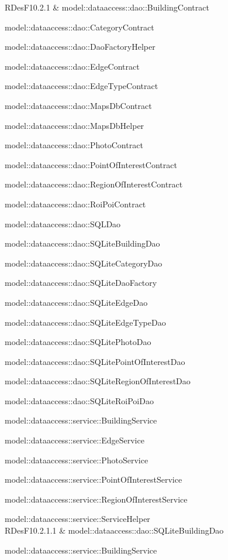 \documentclass[../DefinizioneDiProdotto.tex]{subfiles}
\begin{document}
\begin{longtabu}
RDesF10.2.1 & model::dataaccess::dao::BuildingContract \par model::dataaccess::dao::CategoryContract \par model::dataaccess::dao::DaoFactoryHelper \par model::dataaccess::dao::EdgeContract \par model::dataaccess::dao::EdgeTypeContract \par model::dataaccess::dao::MapsDbContract \par model::dataaccess::dao::MapsDbHelper \par model::dataaccess::dao::PhotoContract \par model::dataaccess::dao::PointOfInterestContract \par model::dataaccess::dao::RegionOfInterestContract \par model::dataaccess::dao::RoiPoiContract \par model::dataaccess::dao::SQLDao \par model::dataaccess::dao::SQLiteBuildingDao \par model::dataaccess::dao::SQLiteCategoryDao \par model::dataaccess::dao::SQLiteDaoFactory \par model::dataaccess::dao::SQLiteEdgeDao \par model::dataaccess::dao::SQLiteEdgeTypeDao \par model::dataaccess::dao::SQLitePhotoDao \par model::dataaccess::dao::SQLitePointOfInterestDao \par model::dataaccess::dao::SQLiteRegionOfInterestDao \par model::dataaccess::dao::SQLiteRoiPoiDao \par model::dataaccess::service::BuildingService \par model::dataaccess::service::EdgeService \par model::dataaccess::service::PhotoService \par model::dataaccess::service::PointOfInterestService \par model::dataaccess::service::RegionOfInterestService \par model::dataaccess::service::ServiceHelper \\ 
\midrule 
RDesF10.2.1.1 & model::dataaccess::dao::SQLiteBuildingDao \par model::dataaccess::service::BuildingService \\ 
\midrule 

\end{longtabu}
\end{document}
